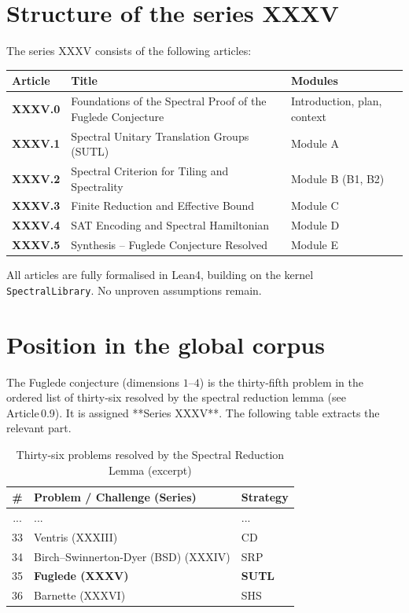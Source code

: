 \documentclass[11pt,a4paper]{article}
\begin{document}
\section{Structure of the series XXXV}

The series XXXV consists of the following articles:

\begin{center}
\small
\begin{tabular}{@{}>{\bfseries}l>{\raggedright\arraybackslash}p{4.5cm}>{\raggedright\arraybackslash}p{6cm}@{}}
\toprule
\textbf{Article} & \textbf{Title} & \textbf{Modules} \\
\midrule
XXXV.0 & Foundations of the Spectral Proof of the Fuglede Conjecture & Introduction, plan, context \\
XXXV.1 & Spectral Unitary Translation Groups (SUTL) & Module A \\
XXXV.2 & Spectral Criterion for Tiling and Spectrality & Module B (B1, B2) \\
XXXV.3 & Finite Reduction and Effective Bound & Module C \\
XXXV.4 & SAT Encoding and Spectral Hamiltonian & Module D \\
XXXV.5 & Synthesis – Fuglede Conjecture Resolved & Module E \\
\bottomrule
\end{tabular}
\end{center}

All articles are fully formalised in Lean4, building on the kernel \texttt{SpectralLibrary}. No unproven assumptions remain.

\section{Position in the global corpus}

The Fuglede conjecture (dimensions $1$–$4$) is the thirty‑fifth problem in the ordered list of thirty‑six resolved by the spectral reduction lemma (see Article 0.9). It is assigned **Series XXXV**. The following table extracts the relevant part.

\begin{center}
\begin{longtable}{@{}cll@{}}
\caption{Thirty‑six problems resolved by the Spectral Reduction Lemma (excerpt)}\\
\toprule
\# & Problem / Challenge (Series) & Strategy \\
\midrule
... & ... & ... \\
33 & Ventris (XXXIII) & CD \\
34 & Birch–Swinnerton-Dyer (BSD) (XXXIV) & SRP \\
35 & \textbf{Fuglede (XXXV)} & \textbf{SUTL} \\
36 & Barnette (XXXVI) & SHS \\
\bottomrule
\end{longtable}
\end{center}
\end{document}
